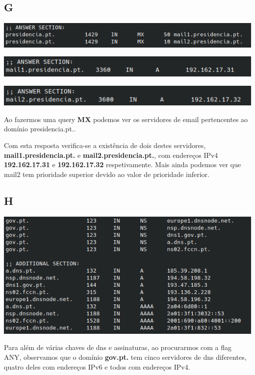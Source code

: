 \documentclass{report}
\begin{document}
        \subsection*{G}
            \noindent
            \includegraphics[width=\textwidth]{images/dig_presidencia.png}
            \par
            \noindent
            \includegraphics[width=\textwidth]{images/mail1_a.png}
            \par
            \noindent
            \includegraphics[width=\textwidth]{images/mail2_a.png}
            \par
            Ao fazermos uma query \textbf{MX} podemos ver os servidores de email pertencentes ao domínio presidencia.pt..\par
            Com esta resposta verifica-se a existência de dois destes servidores, \linebreak \textbf{mail1.presidencia.pt.} e \textbf{mail2.presidencia.pt.}, com endereços IPv4 \linebreak \textbf{192.162.17.31} e \textbf{192.162.17.32} respetivamente.
            Mais ainda podemos ver que mail2 tem prioridade superior devido ao valor de prioridade inferior.
        \subsection*{H}
            \noindent
            \includegraphics[width=\textwidth]{images/dig_gov_any.png}
            \par
            Para além de várias chaves de dns e assinaturas, ao procurarmos com a flag ANY, observamos que o domínio \textbf{gov.pt.} tem cinco servidores de dns diferentes, quatro deles com endereços IPv6 e todos com endereços IPv4.
\end{document}
